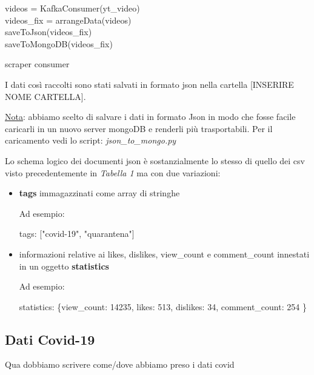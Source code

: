 \begin{algorithm}[H]
	\nl {} {
		\nl {}
		{
			\nl videos = KafkaConsumer(yt\_video)\\
			\nl videos\_fix = arrangeData(videos)\\ 
			\nl saveToJson(videos\_fix)\\
			\nl saveToMongoDB(videos\_fix)
		}
	}
	\caption{scraper consumer}
\end{algorithm}
I dati così raccolti sono stati salvati in formato json nella cartella [INSERIRE NOME CARTELLA].

\underline{Nota}: abbiamo scelto di salvare i dati in formato Json in modo che fosse facile caricarli in un nuovo server mongoDB e renderli più trasportabili. Per il caricamento vedi lo script: \textit{json\_to\_mongo.py}

Lo schema logico dei documenti json è sostanzialmente lo stesso di quello dei csv visto precedentemente in \textit{Tabella 1} ma con due variazioni:
\begin{itemize}
	\item \textbf{tags} immagazzinati come array di stringhe
	
	Ad esempio:
	
	tags: ["covid-19", "quarantena"]
	\item informazioni relative ai likes, dislikes, view\_count e comment\_count innestati in un oggetto \textbf{statistics}
	
	Ad esempio:
	
	statistics: \{view\_count: 14235,
				likes: 513,
				dislikes: 34,
				comment\_count: 254
				\}
\end{itemize}
\subsection*{Dati Covid-19}
Qua dobbiamo scrivere come/dove abbiamo preso i dati covid
